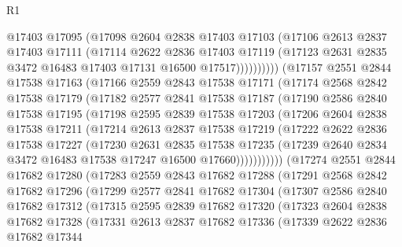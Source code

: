 \begin{lexlean}{R1}
\begin{coremodule}
                @17403
                @17095
                (@17098
                  @2604
                  @2838
                  @17403
                  @17103
                  (@17106
                    @2613
                    @2837
                    @17403
                    @17111
                    (@17114
                      @2622
                      @2836
                      @17403
                      @17119
                      (@17123 @2631 @2835 @3472 @16483 @17403 @17131 @16500 @17517))))))))))
    (@17157
      @2551
      @2844
      @17538
      @17163
      (@17166
        @2559
        @2843
        @17538
        @17171
        (@17174
          @2568
          @2842
          @17538
          @17179
          (@17182
            @2577
            @2841
            @17538
            @17187
            (@17190
              @2586
              @2840
              @17538
              @17195
              (@17198
                @2595
                @2839
                @17538
                @17203
                (@17206
                  @2604
                  @2838
                  @17538
                  @17211
                  (@17214
                    @2613
                    @2837
                    @17538
                    @17219
                    (@17222
                      @2622
                      @2836
                      @17538
                      @17227
                      (@17230
                        @2631
                        @2835
                        @17538
                        @17235
                        (@17239 @2640 @2834 @3472 @16483 @17538 @17247 @16500 @17660)))))))))))
    (@17274
      @2551
      @2844
      @17682
      @17280
      (@17283
        @2559
        @2843
        @17682
        @17288
        (@17291
          @2568
          @2842
          @17682
          @17296
          (@17299
            @2577
            @2841
            @17682
            @17304
            (@17307
              @2586
              @2840
              @17682
              @17312
              (@17315
                @2595
                @2839
                @17682
                @17320
                (@17323
                  @2604
                  @2838
                  @17682
                  @17328
                  (@17331
                    @2613
                    @2837
                    @17682
                    @17336
                    (@17339
                      @2622
                      @2836
                      @17682
                      @17344

\end{coremodule}
\end{lexlean}
